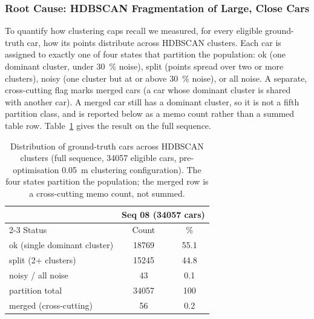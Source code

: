 \subsubsection{Root Cause: HDBSCAN Fragmentation of Large, Close Cars}
\label{sec:split-analysis}

To quantify how clustering caps recall we measured, for every eligible ground-truth
car, how its points distribute across HDBSCAN clusters. Each car is
assigned to exactly one of four states that partition the population: ok (one
dominant cluster, under \SI{30}{\percent} noise), split (points spread over
two or more clusters), noisy (one cluster but at or above \SI{30}{\percent}
noise), or all noise. A separate, cross-cutting flag marks merged cars
(a car whose dominant cluster is shared with another car). A merged car still has a
dominant cluster, so it is not a fifth partition class, and is reported below
as a memo count rather than a summed table row.
Table~\ref{tab:split} gives the result on the full sequence.

\begin{table}[H]
  \centering
  \caption[Ground-truth cars across HDBSCAN clusters]{Distribution of ground-truth cars
    across HDBSCAN clusters (full sequence, \num{34057} eligible cars, pre-optimisation
    \SI{0.05}{\metre} clustering configuration). The four states partition the population; the
    merged row is a cross-cutting memo count, not summed.}
  \label{tab:split}
  \begin{tabular}{lcc}
    \toprule
    & \multicolumn{2}{c}{Seq 08 (\num{34057} cars)} \\
    \cmidrule(lr){2-3}
    Status & Count & \% \\
    \midrule
    ok (single dominant cluster) & 18769 & 55.1 \\
    split (2+ clusters)          & 15245 & 44.8 \\
    noisy / all noise            & 43    & 0.1  \\
    \midrule
    partition total              & 34057 & 100  \\
    \addlinespace
    merged (cross-cutting) & 56 & 0.2 \\
    \bottomrule
  \end{tabular}
\end{table}

